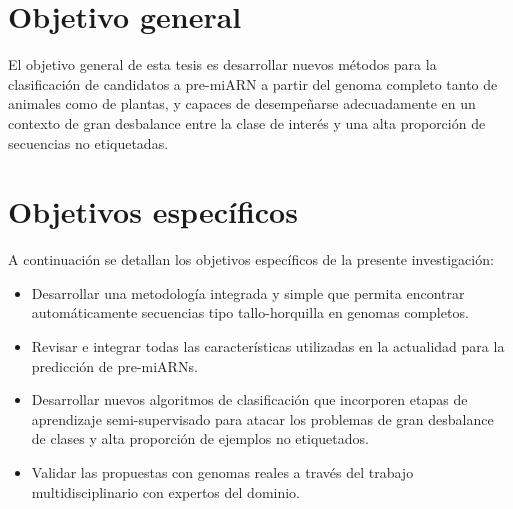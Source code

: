 \section{Objetivo general}

El objetivo general de esta tesis es desarrollar nuevos métodos para la clasificación de candidatos a pre-miARN a partir del  genoma completo tanto de
animales como de plantas, y capaces de desempeñarse adecuadamente en un contexto de gran desbalance entre la clase de interés y una alta proporción de
secuencias no etiquetadas.

\section{Objetivos específicos}

A continuación se detallan los objetivos específicos de la presente investigación:
\begin{itemize}
	\item Desarrollar una metodología integrada y simple que permita encontrar automáticamente secuencias tipo tallo-horquilla en genomas completos.
	\item Revisar e integrar todas las características utilizadas en la actualidad para la predicción de pre-miARNs.
	\item Desarrollar nuevos algoritmos de clasificación que incorporen etapas de aprendizaje semi-supervisado para atacar los problemas de gran
		desbalance de clases y alta proporción de ejemplos no etiquetados.
	\item Validar las propuestas con genomas reales a través del trabajo multidisciplinario con expertos del dominio.
\end{itemize}

